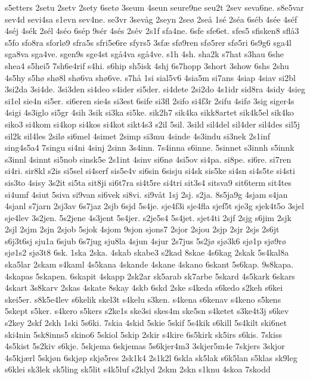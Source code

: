 {s5etters
2setu
2setv
2sety
6setø
3seum
4seun
seure9ne
seu2t
2sev
seva6ne.
s8e5var
sev4d
sevi4sa
s1evn
sev4ne.
se3vr
3sevåg
2seyn
2seø
2seå
1sé
2séa
6séb
4sée
4séf
4séj
4sék
2sél
4séo
6sép
9sér
4sés
2sév
2s1f
sfa4ne.
6sfe
sfe6et.
sfes5
sfisken8
sflå3
s5fo
sfo8ra
sforlø9
sfra5s
sfri5e6re
sfyrs5
3sfæ
sfø9ren
sfø5rer
sfø5ri
6s9g6
sga4l
sga8va
sga4ve.
sgen9s
sge4st
sgå4va
sgå4ve.
s1h
4sh.
sha2k
s7hat
s3hau
6she
shea4
s5hei5
7sh6e4rif
s4hi.
s6hip
sh5isk
4shj
6s7hopp
3short
3show
6shs
2shu
4s5hy
s5hø
shø8l
shø6va
shø6ve.
s7hå
1si
sial5v6
4sia5m
si7ans
4siap
4siav
si2bl
3si2da
3si4de.
3si3den
si4deo
s4ider
si5der.
si4dete
2si2do
4s1idr
sid8ra
4sidy
4sieg
si1el
sie4n
si5er.
si6eren
sie4s
si3est
6sife
si3fl
2sifo
si4f3r
2sifu
4sifø
3sig
siger4s
4sigi
4s3iglo
si5gr
4sih
3sik
si3ka
si5ke.
sik2h7
sik4ka
sikk8artet
sik4k5el
sik4ko
siko3
si4kom
si4kop
si4kos
si4kot
sikt4s3
s2il
5sil.
3sild
sil4del
sil4der
sil4des
sil5j
sil2k
sil4les
2silø
si6mel
4simet
2simp
si3mu
4sinde
4s3indu
si3nek
2s1inf
sing4s5a4
7singu
si4ni
4sinj
2sinn
3s4inn.
7s4inna
s6inne.
5sinnet
s3innh
s5innk
s3innl
4sinnt
si5nob
sinsk5e
2s1int
4sinv
si6nø
4si5ov
si4pa.
si8pe.
si6re.
si7ren
si4ri.
sir8kl
s2is
si5sel
si4serf
sis5e4v
si6sin
6sisju
si4sk
sis5ke
si4sn
si4s5te
si4sti
sis3to
4sisy
3s2it
si5ta
sit8ji
si6t7ra
si4t5re
si4tri
sit3s4
sitsva9
sit6term
sit4tes
si4umf
4siut
5siva
si9van
si6vek
si8vi.
si9våt
1sj
2sj.
s2ja.
8s5ja9g
4sjam
s4jan
4sjanl
s7jarn
2sj3av
6s7jaz
2sjb
6sjd
5s4je.
sje4f3i
sje4fla
sjef5t
sje3g
sjek4t5o
3sjel
sje4lev
3s2jen.
5s2jene
4s3jent
5s4jer.
s2je5s4
5s4jet.
sjet4ti
2sjf
2sjg
s6jim
2sjk
2sjl
2sjm
2sjn
2sjob
5sjok
4sjom
9sjon
sjons7
2sjor
2sjou
2sjp
2sjr
2sjs
2s6jt
s6j3t6sj
sju1a
6sjub
6s7jug
sju8la
4sjun
4sjur
2s7jus
5s2jø
sjø3k6
sjø1p
sjø9rø
sjø1s2
sjø3t8
6sk.
1ska
2ska.
4skab
skabe3
s2kad
8skae
4s6kag
2skak
5s4kal8a
ska5lar
2skam
s4kaml
4s5kana
4skande
4skane
4skano
6skant
5s6kap.
9s8kapa.
4skapas
5skapen.
6skapit
4skapp
2sk2ar
sk5arab
sk7arbe
5skard
4s5kark
6skars
4skart
3s8karv
2skas
4skate
8skay
4skb
6skd
2ske
s4keda
s6kedo
s2keh
s6kei
skei5er.
s8k5e4lev
s6kelik
skel3t
s4kelu
s3ken.
s4kena
s6kenav
s4keno
s5kens
5skept
s5ker.
s4kero
s5kers
s2ke1s
ske3si
skes4m
ske5sn
s4ketet
s3ke4t3j
s6kev
s2key
2skf
2skh
1ski
5s6ki.
7skia
4skid
5skie
5skif
5s4kik
s6kill
5s4kilt
ski6net
ski4nin
5sk8inns5
skino6
5skiol
5skip
2skir
s4kire
6s5kirk
sk5irs
s6kis.
7skiss
4s5kist
5s2kiv
s6kje.
5skjema
6skjemas
5s6kjer4m3
3skjer5m4e
7skjers
3skjor
4s5kjærl
5skjøn
6skjøp
skjø5res
2sk1k4
2s1k2l
6skla
sk5lak
s6k5lan
s5klas
sk9leg
s6klei
sk3lek
sk5ling
sk5lit
s4k5luf
s2klyd
2skm
2skn
s1knu
4skoa
7skodd
}
